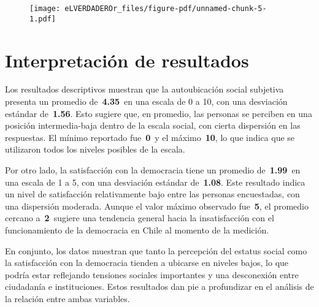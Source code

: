 \documentclass[
  11pt,
]{article}
\begin{document}
\begin{figure}[H]

{\centering \texttt{[image: eLVERDADEROr\_files/figure-pdf/unnamed-chunk-5-1.pdf]}

}

\end{figure}

\hypertarget{interpretaciuxf3n-de-resultados}{%
\section{Interpretación de
resultados}\label{interpretaciuxf3n-de-resultados}}

Los resultados descriptivos muestran que la autoubicación social
subjetiva presenta un promedio de~\textbf{4.35}~en una escala de 0 a 10,
con una desviación estándar de~\textbf{1.56}. Esto sugiere que, en
promedio, las personas se perciben en una posición intermedia-baja
dentro de la escala social, con cierta dispersión en las respuestas. El
mínimo reportado fue~\textbf{0}~y el máximo~\textbf{10}, lo que indica
que se utilizaron todos los niveles posibles de la escala.

Por otro lado, la satisfacción con la democracia tiene un promedio
de~\textbf{1.99}~en una escala de 1 a 5, con una desviación estándar
de~\textbf{1.08}. Este resultado indica un nivel de satisfacción
relativamente bajo entre las personas encuestadas, con una dispersión
moderada. Aunque el valor máximo observado fue~\textbf{5}, el promedio
cercano a~\textbf{2}~sugiere una tendencia general hacia la
insatisfacción con el funcionamiento de la democracia en Chile al
momento de la medición.

En conjunto, los datos muestran que tanto la percepción del estatus
social como la satisfacción con la democracia tienden a ubicarse en
niveles bajos, lo que podría estar reflejando tensiones sociales
importantes y una desconexión entre ciudadanía e instituciones. Estos
resultados dan pie a profundizar en el análisis de la relación entre
ambas variables.
\end{document}
